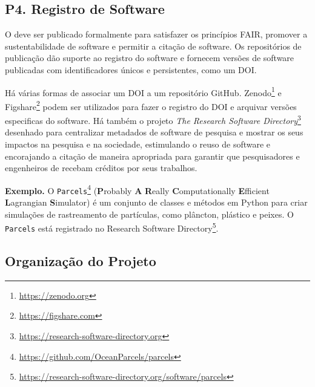 
\subsection*{P4. Registro de Software}

O \RSw deve ser publicado formalmente para satisfazer os princípios FAIR, promover a sustentabilidade de software e permitir a citação de software. Os repositórios de publicação dão suporte ao registro do software e fornecem versões de software publicadas com identificadores únicos e persistentes, como um DOI.

Há várias formas de associar um DOI a um repositório GitHub. 
Zenodo\footnote{\url{https://zenodo.org}} e Figshare\footnote{\url{https://figshare.com}} 
podem ser utilizados para fazer o registro do DOI e arquivar versões especificas do software. 
%
Há também o projeto {\em The Research Software Directory}\footnote{\url{https://research-software-directory.org}} desenhado para centralizar metadados de software de pesquisa e mostrar os seus impactos na pesquisa e na sociedade, estimulando o reuso de software e encorajando a citação de maneira apropriada para garantir que pesquisadores e engenheiros de \RSw  recebam créditos por seus trabalhos. 

\noindent \textbf{Exemplo.}
O \RSw \texttt{Parcels}\footnote{\url{https://github.com/OceanParcels/parcels}} (\textbf{P}robably \textbf{A} \textbf{R}eally \textbf{C}omputationally \textbf{E}fficient \textbf{L}agrangian \textbf{S}imulator) é um conjunto de classes e métodos em Python para criar simulações de rastreamento de partículas, como plâncton, plástico e peixes. 
O \texttt{Parcels} está registrado no Research Software Directory\footnote{\url{https://research-software-directory.org/software/parcels}}.






\subsection{Organização do Projeto}

